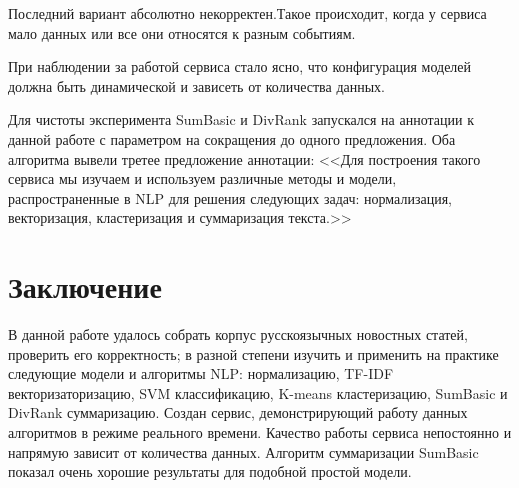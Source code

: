 \documentclass[a4paper, 14pt]{extarticle}
\begin{document}
Последний вариант абсолютно некорректен.Такое происходит, когда у сервиса мало данных или все они относятся к разным событиям.

При наблюдении за работой сервиса стало ясно, что конфигурация моделей должна быть динамической и зависеть от количества данных.

Для чистоты эксперимента SumBasic и DivRank запускался на аннотации к данной работе с параметром на сокращения до одного предложения. Оба алгоритма вывели третее предложение аннотации: <<Для построения такого сервиса мы изучаем и используем различные методы и модели, распространенные в NLP для решения следующих задач: нормализация, векторизация, кластеризация и суммаризация текста.>>

\section{Заключение}
В данной работе удалось собрать корпус русскоязычных новостных статей, проверить его корректность; в разной степени изучить и применить на практике следующие модели и алгоритмы NLP: нормализацию, TF-IDF векторизаторизацию, SVM классификацию, K-means кластеризацию, SumBasic и DivRank суммаризацию. Создан сервис, демонстрирующий работу данных алгоритмов в режиме реального времени. Качество работы сервиса непостоянно и напрямую зависит от количества данных.
Алгоритм суммаризации SumBasic показал очень хорошие результаты для подобной простой модели.

\end{document}
